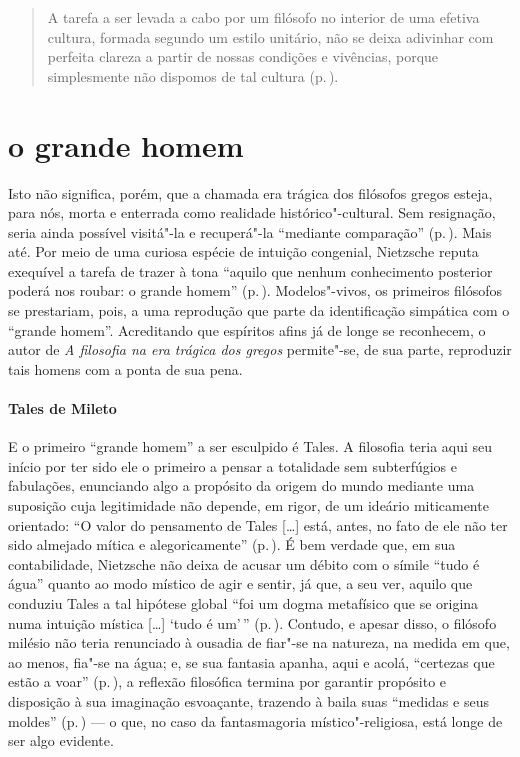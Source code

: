 \begin{quote} 
A tarefa a ser levada a cabo por um filósofo no interior de
 uma efetiva cultura, formada segundo um estilo unitário, não se deixa
 adivinhar com perfeita clareza a partir de nossas condições e vivências,
 porque simplesmente não dispomos de tal cultura (p.\,\pageref{tarefaaserlevada}).
\end{quote} 

\section{o grande homem} 

Isto não significa, porém, que a chamada era trágica dos filósofos gregos 
esteja, para nós, morta e enterrada como realidade
 histórico"-cultural. Sem resignação, seria ainda possível visitá"-la e
 recuperá"-la ``mediante comparação'' (p.\,\pageref{comparacao}). Mais até.
 Por meio de uma curiosa espécie de intuição congenial, Nietzsche reputa
 exequível a tarefa de trazer à tona ``aquilo que nenhum conhecimento
 posterior poderá nos roubar: o grande homem'' (p.\,\pageref{ograndehomem}). 
 Modelos"-vivos, os primeiros filósofos se prestariam, pois,
 a uma reprodução que parte da identificação simpática com o ``grande
 homem''. Acreditando que espíritos afins já de longe se reconhecem, o autor
 de \textit{A filosofia na era trágica dos gregos} permite"-se, de sua parte,
 reproduzir tais homens com a ponta de sua pena.

\paragraph{Tales de Mileto} E o primeiro ``grande homem'' a ser esculpido é
 Tales. A filosofia teria aqui seu início por ter sido ele o primeiro a
 pensar a totalidade sem subterfúgios e fabulações, enunciando algo a
 propósito da origem do mundo mediante uma suposição cuja legitimidade não
 depende, em rigor, de um ideário miticamente orientado: ``O valor do
 pensamento de Tales [\ldots] está, antes, no fato de ele não ter sido
 almejado mítica e alegoricamente'' (p.\,\pageref{pensamentodetales}). É bem
 verdade que, em sua contabilidade, Nietzsche não deixa de acusar um débito
 com o símile ``tudo é água'' quanto ao modo místico de agir e sentir, já
 que, a seu ver, aquilo que conduziu Tales a tal hipótese global ``foi um
 dogma metafísico que se origina numa intuição mística [\ldots] `tudo é
 um'\,'' (p.\,\pageref{foiumdogma}). Contudo, e apesar disso, o filósofo
 milésio não teria renunciado à ousadia de fiar"-se na natureza, na medida em
 que, ao menos, fia"-se na água; e, se sua fantasia apanha, aqui e acolá,
 ``certezas que estão a voar'' (p.\,\pageref{certezasque}), a reflexão
 filosófica termina por garantir propósito e disposição à sua imaginação
 esvoaçante, trazendo à baila suas ``medidas e seus moldes'' 
 (p.\,\pageref{medidaseseusmoldes}) --- o que, no caso da fantasmagoria místico"-religiosa,
 está longe de ser algo evidente.

